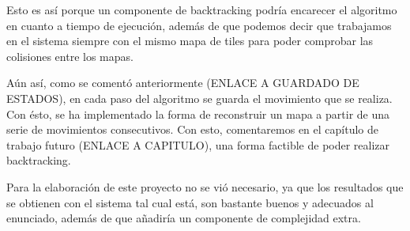 Esto es así porque un componente de backtracking podría encarecer el algoritmo en cuanto a tiempo de ejecución, además de que podemos decir que trabajamos en el sistema siempre con el mismo mapa de tiles para poder comprobar las colisiones entre los mapas.

Aún así, como se comentó anteriormente (ENLACE A GUARDADO DE ESTADOS), en cada paso del algoritmo se guarda el movimiento que se realiza. Con ésto, se ha implementado la forma de reconstruir un mapa a partir de una serie de movimientos consecutivos. Con esto, comentaremos en el capítulo de trabajo futuro (ENLACE A CAPITULO), una forma factible de poder realizar backtracking.

Para la elaboración de este proyecto no se vió necesario, ya que los resultados que se obtienen con el sistema tal cual está, son bastante buenos y adecuados al enunciado, además de que añadiría un componente de complejidad extra.
